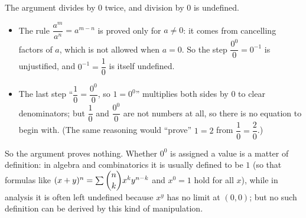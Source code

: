 The argument divides by $0$ twice, and division by $0$ is undefined.
\begin{itemize}
\item The rule $\dfrac{a^m}{a^n}=a^{m-n}$ is proved only for $a\ne0$: it comes from cancelling factors of $a$, which is not allowed when $a=0$. So the step $\dfrac{0^0}{0}=0^{-1}$ is unjustified, and $0^{-1}=\dfrac{1}{0}$ is itself undefined.
\item The last step ``$\dfrac{1}{0}=\dfrac{0^0}{0}$, so $1=0^0$'' multiplies both sides by $0$ to clear denominators; but $\dfrac{1}{0}$ and $\dfrac{0^0}{0}$ are not numbers at all, so there is no equation to begin with. (The same reasoning would ``prove'' $1=2$ from $\dfrac{1}{0}=\dfrac{2}{0}$.)
\end{itemize}
So the argument proves nothing. Whether $0^0$ is assigned a value is a matter of definition: in algebra and combinatorics it is usually defined to be $1$ (so that formulas like $(x+y)^n=\sum\dbinom{n}{k}x^ky^{n-k}$ and $x^0=1$ hold for all $x$), while in analysis it is often left undefined because $x^y$ has no limit at $(0,0)$; but no such definition can be derived by this kind of manipulation.
